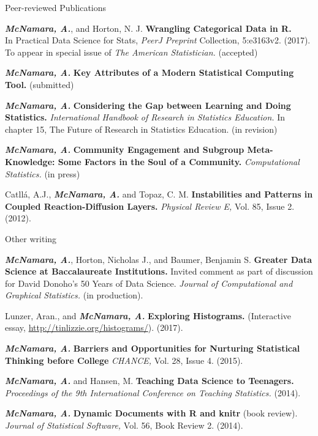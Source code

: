 \documentclass{resume} %
\begin{document}

\begin{rSection}{Peer-reviewed Publications}

{\bf \em{McNamara, A.}}, and Horton, N. J. { \bf Wrangling Categorical Data in R. } 
\\In Practical Data Science for Stats, {\em PeerJ Preprint} Collection, 5:e3163v2. (2017).  
\\
To appear in special issue of {\em The American Statistician.} (accepted)

{\bf \em{McNamara, A.}} {\bf Key Attributes of a Modern Statistical Computing Tool. } (submitted)


{\bf \em McNamara, A.} {\bf Considering the Gap between Learning and Doing Statistics.} {\em International Handbook of Research in Statistics Education.} In chapter 15, The Future of Research in Statistics Education. (in revision) 

{\bf \em McNamara, A.} {\bf Community Engagement and Subgroup Meta-Knowledge: Some Factors in the Soul of a Community.} { \em Computational Statistics.} (in press)

{Catll{\'a}, A.J., {\bf \em McNamara, A.} and Topaz, C. M. } {\bf Instabilities and Patterns in Coupled Reaction-Diffusion Layers.} {\em Physical Review E,} Vol. 85, Issue 2. (2012). 

\end{rSection}



\begin{rSection}{Other writing}

{\bf \em McNamara, A.}, Horton, Nicholas J., and Baumer, Benjamin S. {\bf Greater Data Science at Baccalaureate Institutions.} Invited comment as part of discussion for David Donoho's 50 Years of Data Science. {\em Journal of Computational and Graphical Statistics.} (in production).

Lunzer, Aran., and {\bf \em McNamara, A.} {\bf Exploring Histograms.} (Interactive essay, \url{http://tinlizzie.org/histograms/}). (2017). 

{\bf \em McNamara, A.} {\bf Barriers and Opportunities for Nurturing Statistical Thinking before College}{ \em CHANCE,} Vol. 28, Issue 4. (2015).

{\bf \em McNamara, A. }and Hansen, M. {\bf Teaching Data Science to Teenagers.}{ \em Proceedings of the 9th International Conference on Teaching Statistics.} (2014). 

{\bf \em McNamara, A. }{\bf Dynamic Documents with R and knitr} (book review). {\em Journal of Statistical Software,}{ Vol. 56, Book Review 2.} (2014).
\end{rSection}
\end{document}
